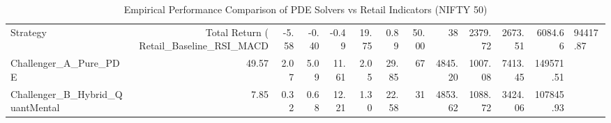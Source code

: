 \begin{table}
\caption{Empirical Performance Comparison of PDE Solvers vs Retail Indicators (NIFTY 50)}
\label{tab:results}
\begin{tabular}{lrrrrrrrrrrr}
\toprule
Strategy & Total Return (%
\midrule
Retail_Baseline_RSI_MACD & -5.58 & -0.40 & -0.49 & 19.75 & 0.89 & 50.00 & 38 & 2379.72 & 2673.51 & 6084.66 & 94417.87 \\
Challenger_A_Pure_PDE & 49.57 & 2.07 & 5.09 & 11.61 & 2.05 & 29.85 & 67 & 4845.20 & 1007.08 & 7413.45 & 149571.51 \\
Challenger_B_Hybrid_QuantMental & 7.85 & 0.32 & 0.68 & 12.21 & 1.30 & 22.58 & 31 & 4853.62 & 1088.72 & 3424.06 & 107845.93 \\
\bottomrule
\end{tabular}
\end{table}
